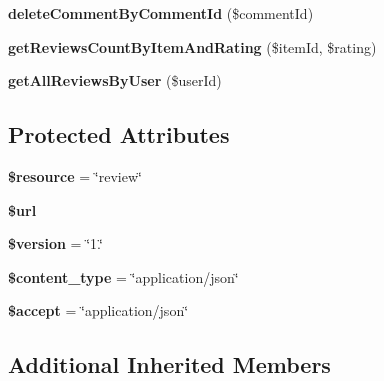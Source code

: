 \begin{DoxyCompactItemize}
\item 
\hypertarget{class_review_service_ad6002fbfb969ed70bf30fa380a5c0e07}{{\bfseries delete\+Comment\+By\+Comment\+Id} (\$comment\+Id)}\label{class_review_service_ad6002fbfb969ed70bf30fa380a5c0e07}

\item 
\hypertarget{class_review_service_a5445a4615c627db532165a4bbcbfb60b}{{\bfseries get\+Reviews\+Count\+By\+Item\+And\+Rating} (\$item\+Id, \$rating)}\label{class_review_service_a5445a4615c627db532165a4bbcbfb60b}

\item 
\hypertarget{class_review_service_af834221f95576e2ddf38bd85693351f7}{{\bfseries get\+All\+Reviews\+By\+User} (\$user\+Id)}\label{class_review_service_af834221f95576e2ddf38bd85693351f7}

\end{DoxyCompactItemize}
\subsection*{Protected Attributes}
\begin{DoxyCompactItemize}
\item 
\hypertarget{class_review_service_abd4c7b8b084214b8d2533ba07fce6b83}{{\bfseries \$resource} = \char`\"{}review\char`\"{}}\label{class_review_service_abd4c7b8b084214b8d2533ba07fce6b83}

\item 
\hypertarget{class_review_service_acf215f34a917d014776ce684a9ee8909}{{\bfseries \$url}}\label{class_review_service_acf215f34a917d014776ce684a9ee8909}

\item 
\hypertarget{class_review_service_a17c8948c68aa44fa9961ae169b6a8961}{{\bfseries \$version} = \char`\"{}1.\char`\"{}}\label{class_review_service_a17c8948c68aa44fa9961ae169b6a8961}

\item 
\hypertarget{class_review_service_ae754d6373f275e781f47c8bc9b994b6d}{{\bfseries \$content\+\_\+type} = \char`\"{}application/json\char`\"{}}\label{class_review_service_ae754d6373f275e781f47c8bc9b994b6d}

\item 
\hypertarget{class_review_service_a75fc18c4ff06288ff9fdf8aba9bd1081}{{\bfseries \$accept} = \char`\"{}application/json\char`\"{}}\label{class_review_service_a75fc18c4ff06288ff9fdf8aba9bd1081}

\end{DoxyCompactItemize}
\subsection*{Additional Inherited Members}


